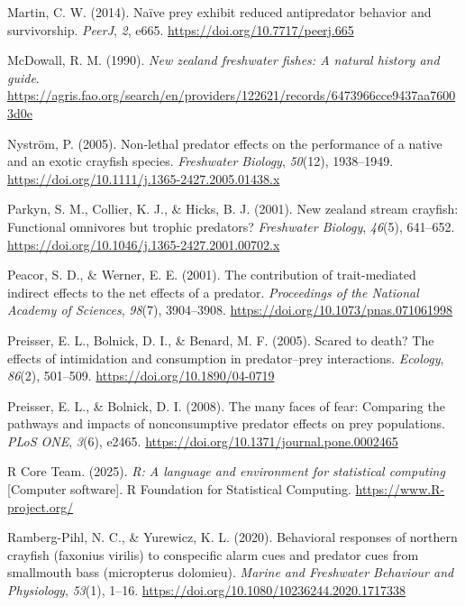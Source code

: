 \documentclass[
  letterpaper,
  DIV=11,
  numbers=noendperiod]{scrartcl}
\newlength{\cslhangindent}
\newenvironment{CSLReferences}[2] %
 {\begin{list}{}{%
  \setlength{\itemindent}{0pt}
  \setlength{\leftmargin}{0pt}
  \setlength{\parsep}{0pt}
  \ifodd #1
   \setlength{\leftmargin}{\cslhangindent}
   \setlength{\itemindent}{-1\cslhangindent}
  \fi
  \setlength{\itemsep}{#2\baselineskip}}}
 {\end{list}}
\begin{document}
\begin{CSLReferences}{1}{0}
Martin, C. W. (2014). Naïve prey exhibit reduced antipredator behavior
and survivorship. \emph{PeerJ}, \emph{2}, e665.
\url{https://doi.org/10.7717/peerj.665}

McDowall, R. M. (1990). \emph{New zealand freshwater fishes: A natural
history and guide}.
\url{https://agris.fao.org/search/en/providers/122621/records/6473966cce9437aa76003d0e}

Nyström, P. (2005). Non‐lethal predator effects on the performance of a
native and an exotic crayfish species. \emph{Freshwater Biology},
\emph{50}(12), 1938--1949.
\url{https://doi.org/10.1111/j.1365-2427.2005.01438.x}

Parkyn, S. M., Collier, K. J., \& Hicks, B. J. (2001). New zealand
stream crayfish: Functional omnivores but trophic predators?
\emph{Freshwater Biology}, \emph{46}(5), 641--652.
\url{https://doi.org/10.1046/j.1365-2427.2001.00702.x}

Peacor, S. D., \& Werner, E. E. (2001). The contribution of
trait-mediated indirect effects to the net effects of a predator.
\emph{Proceedings of the National Academy of Sciences}, \emph{98}(7),
3904--3908. \url{https://doi.org/10.1073/pnas.071061998}

Preisser, E. L., Bolnick, D. I., \& Benard, M. F. (2005). Scared to
death? The effects of intimidation and consumption in predator--prey
interactions. \emph{Ecology}, \emph{86}(2), 501--509.
\url{https://doi.org/10.1890/04-0719}

Preisser, E. L., \& Bolnick, D. I. (2008). The many faces of fear:
Comparing the pathways and impacts of nonconsumptive predator effects on
prey populations. \emph{PLoS ONE}, \emph{3}(6), e2465.
\url{https://doi.org/10.1371/journal.pone.0002465}

R Core Team. (2025). \emph{R: A language and environment for statistical
computing} {[}Computer software{]}. R Foundation for Statistical
Computing. \url{https://www.R-project.org/}

Ramberg-Pihl, N. C., \& Yurewicz, K. L. (2020). Behavioral responses of
northern crayfish (faxonius virilis) to conspecific alarm cues and
predator cues from smallmouth bass (micropterus dolomieu). \emph{Marine
and Freshwater Behaviour and Physiology}, \emph{53}(1), 1--16.
\url{https://doi.org/10.1080/10236244.2020.1717338}


\end{CSLReferences}
\end{document}
